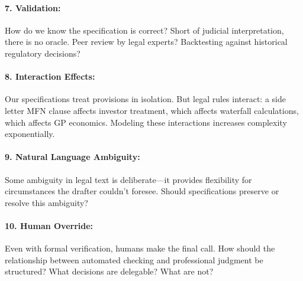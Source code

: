 \paragraph{7. Validation:} How do we know the specification is correct? Short of judicial interpretation, there is no oracle. Peer review by legal experts? Backtesting against historical regulatory decisions?

\paragraph{8. Interaction Effects:} Our specifications treat provisions in isolation. But legal rules interact: a side letter MFN clause affects investor treatment, which affects waterfall calculations, which affects GP economics. Modeling these interactions increases complexity exponentially.

\paragraph{9. Natural Language Ambiguity:} Some ambiguity in legal text is deliberate---it provides flexibility for circumstances the drafter couldn't foresee. Should specifications preserve or resolve this ambiguity?

\paragraph{10. Human Override:} Even with formal verification, humans make the final call. How should the relationship between automated checking and professional judgment be structured? What decisions are delegable? What are not?
